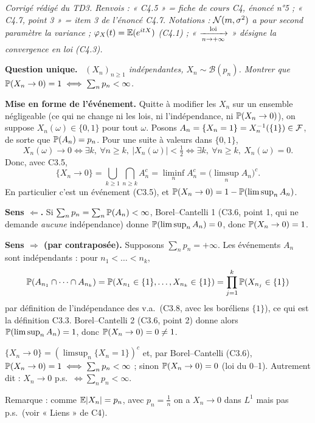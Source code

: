 \documentclass[11pt,a4paper]{article}
\newcommand{\question}[1]{\par\medskip\noindent\textbf{Question #1.}~}
\newcommand{\Bin}{\mathcal{B}}
\begin{document}

\textit{Corrigé rédigé du TD3. Renvois : « C4.5 » = fiche de cours C4, énoncé n°5 ; « C4.7, point 3 » = item 3 de
l'énoncé C4.7. Notations : $\mathcal{N}(m,\sigma^2)$ a pour second paramètre la \emph{variance} ; $\varphi_X(t)=\mathbb{E}(e^{itX})$ (C4.1) ;
« $\xrightarrow[n\to+\infty]{\text{loi}}$ » désigne la convergence en loi (C4.3).}

\begin{exo}

\question{unique} \emph{$(X_n)_{n\ge1}$ indépendantes, $X_n\sim\Bin(p_n)$. Montrer que $\mathbb{P}(X_n\to0)=1\iff\sum_np_n<\infty$.}

\textbf{Mise en forme de l'événement.} Quitte à modifier les $X_n$ sur un ensemble négligeable (ce qui ne change ni les lois, ni
l'indépendance, ni $\mathbb{P}(X_n\to0)$), on suppose $X_n(\omega)\in\{0,1\}$ pour tout $\omega$. Posons $A_n=\{X_n=1\}=X_n^{-1}(\{1\})\in\mathcal{F}$,
de sorte que $\mathbb{P}(A_n)=p_n$. Pour une suite à valeurs dans $\{0,1\}$,
\[X_n(\omega)\to0\iff\exists k,\ \forall n\ge k,\ |X_n(\omega)|<\tfrac12\iff\exists k,\ \forall n\ge k,\ X_n(\omega)=0 .\]
Donc, avec C3.5,
\[\{X_n\to0\}=\bigcup_{k\ge1}\bigcap_{n\ge k}A_n^c=\liminf_nA_n^c=\bigl(\limsup_nA_n\bigr)^c .\]
En particulier c'est un événement (C3.5), et $\mathbb{P}(X_n\to0)=1-\mathbb{P}(\limsup_nA_n)$.

\textbf{Sens $\Leftarrow$.} Si $\sum_np_n=\sum_n\mathbb{P}(A_n)<\infty$, Borel--Cantelli 1 (C3.6, point 1, qui ne demande \emph{aucune}
indépendance) donne $\mathbb{P}(\limsup_nA_n)=0$, donc $\mathbb{P}(X_n\to0)=1$.

\textbf{Sens $\Rightarrow$ (par contraposée).} Supposons $\sum_np_n=+\infty$. Les événements $A_n$ sont indépendants : pour $n_1<\dots<n_k$,
\[\mathbb{P}(A_{n_1}\cap\dots\cap A_{n_k})=\mathbb{P}(X_{n_1}\in\{1\},\dots,X_{n_k}\in\{1\})=\prod_{j=1}^k\mathbb{P}(X_{n_j}\in\{1\})\]
par définition de l'indépendance des v.a.\ (C3.8, avec les boréliens $\{1\}$), ce qui est la définition C3.3. Borel--Cantelli 2
(C3.6, point 2) donne alors $\mathbb{P}(\limsup_nA_n)=1$, donc $\mathbb{P}(X_n\to0)=0\neq1$.
\begin{resultat}
$\{X_n\to0\}=(\limsup_n\{X_n=1\})^c$ et, par Borel--Cantelli (C3.6), $\mathbb{P}(X_n\to0)=1\iff\sum_np_n<\infty$ ; sinon $\mathbb{P}(X_n\to0)=0$
(loi du 0--1). Autrement dit : $X_n\to0$ p.s.\ $\iff\sum_np_n<\infty$.
\end{resultat}
Remarque : comme $\mathbb{E}|X_n|=p_n$, avec $p_n=\frac1n$ on a $X_n\to0$ dans $L^1$ mais pas p.s.\ (voir « Liens » de C4).
\end{exo}
\end{document}
